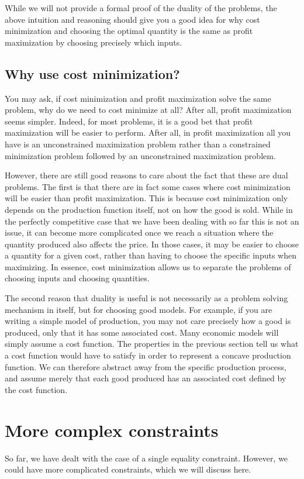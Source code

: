 While we will not provide a formal proof of the duality of the problems, the above intuition and reasoning should give you a good idea for why cost minimization and choosing the optimal quantity is the same as profit maximization by choosing precisely which inputs. 

\subsection*{Why use cost minimization?}
You may ask, if cost minimization and profit maximization solve the same problem, why do we need to cost minimize at all? After all, profit maximization seems simpler. Indeed, for most problems, it is a good bet that profit maximization will be easier to perform. After all, in profit maximization all you have is an unconstrained maximization problem rather than a constrained minimization problem followed by an unconstrained maximization problem.

However, there are still good reasons to care about the fact that these are dual problems. The first is that there are in fact some cases where cost minimization will be easier than profit maximization. This is because cost minimization only depends on the production function itself, not on how the good is sold. While in the perfectly competitive case that we have been dealing with so far this is not an issue, it can become more complicated once we reach a situation where the quantity produced also affects the price. In those cases, it may be easier to choose a quantity for a given cost, rather than having to choose the specific inputs when maximizing. In essence, cost minimization allows us to separate the problems of choosing inputs and choosing quantities.

The second reason that duality is useful is not necessarily as a problem solving mechanism in itself, but for choosing good models. For example, if you are writing a simple model of production, you may not care precisely how a good is produced, only that it has some associated cost. Many economic models will simply assume a cost function. The properties in the previous section tell us what a cost function would have to satisfy in order to represent a concave production function. We can therefore abstract away from the specific production process, and assume merely that each good produced has an associated cost defined by the cost function.

\section{More complex constraints}
So far, we have dealt with the case of a single equality constraint. However, we could have more complicated constraints, which we will discuss here.

